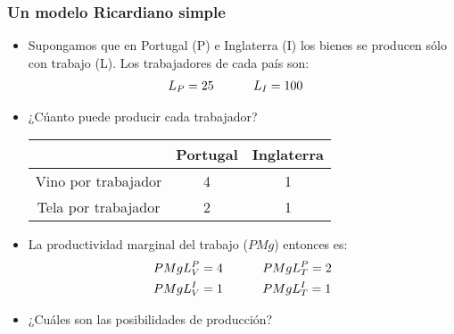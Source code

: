 \documentclass{beamer}
\begin{document}
\begin{frame}
\frametitle{Un modelo Ricardiano simple}
\begin{itemize}
    \item Supongamos que en Portugal (P) e Inglaterra (I) los bienes se producen sólo con trabajo (L). Los trabajadores de cada país son:
            \begin{equation*}
                \begin{aligned}
                L_P=25 \, \hspace{10mm} &\, L_I=100
                \end{aligned}
            \end{equation*}
    \item ¿Cúanto puede producir cada trabajador? \vspace{2mm}
        \begin{center}
            \begin{tabular}{|c|c|c|} \hline
            \rowcolor{blue!20}
                & Portugal & Inglaterra \\ \hline
                Vino por trabajador   & 4 & 1 \\ \hline
                Tela por trabajador   & 2 & 1 \\ \hline     
            \end{tabular}
        \end{center}
    \vspace{2mm}
    \item La productividad marginal del trabajo ($PMg$) entonces es: 
            \begin{equation*}
                \begin{aligned}
                    PMgL_V^{P} = 4 \, \hspace{10mm} &\, PMgL_T^{P} = 2 \\
                    PMgL_V^{I} = 1 \, \hspace{10mm}&\, PMgL_T^{I} = 1
                \end{aligned}
            \end{equation*}
       \vspace{-4mm}
     \item ¿Cuáles son las posibilidades de producción?    
    \end{itemize} 
\end{frame}
\end{document}
